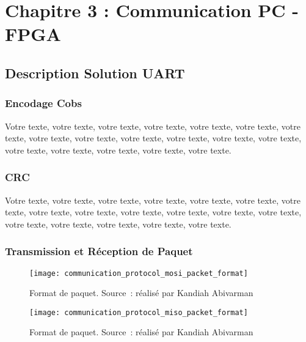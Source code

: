 \chapter{Chapitre 3 : Communication PC - FPGA}

\section{Description Solution UART}

\subsection{Encodage Cobs}

Votre texte, votre texte, votre texte, votre texte, votre texte, votre texte, votre texte, votre texte, votre texte, votre texte, votre texte, votre texte, votre texte, votre texte, votre texte, votre texte, votre texte, votre texte.

\subsection{CRC}

Votre texte, votre texte, votre texte, votre texte, votre texte, votre texte, votre texte, votre texte, votre texte, votre texte, votre texte, votre texte, votre texte, votre texte, votre texte, votre texte, votre texte, votre texte.

\subsection{Transmission et Réception de Paquet}

\begin{figure}[tbph!]
	\centering
	\texttt{[image: communication\_protocol\_mosi\_packet\_format]}
	\caption[Format de paquet - MOSI]{Format de paquet. Source : réalisé par Kandiah Abivarman}
	\label{fig:mosi_packet_format}
\end{figure}

\newpage

\begin{figure}[tbph!]
	\centering
	\texttt{[image: communication\_protocol\_miso\_packet\_format]}
	\caption[Format de paquet - MISO]{Format de paquet. Source : réalisé par Kandiah Abivarman}
	\label{fig:miso_packet_format}
\end{figure}

\newpage

